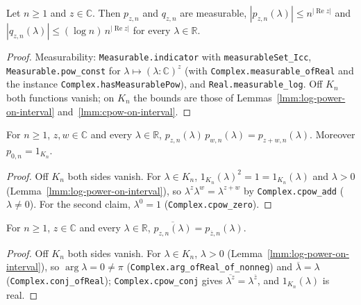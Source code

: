 \begin{lemma}
    \label{lmm:modular-power-function-bounds}
    \leanok
    Let $n \ge 1$ and $z \in \mathbb{C}$. Then $p_{z,n}$ and $q_{z,n}$ are measurable, $|p_{z,n}(\lambda)| \le n^{|\operatorname{Re} z|}$ and $|q_{z,n}(\lambda)| \le (\log n)\, n^{|\operatorname{Re} z|}$ for every $\lambda \in \mathbb{R}$.
\end{lemma}
\begin{proof}
    \leanok
    Measurability: \texttt{Measurable.indicator} with \texttt{measurableSet\_Icc}, \texttt{Measurable.pow\_const} for $\lambda \mapsto (\lambda : \mathbb{C})^z$ (with \texttt{Complex.measurable\_ofReal} and the instance \texttt{Complex.hasMeasurablePow}), and \texttt{Real.measurable\_log}. Off $K_n$ both functions vanish; on $K_n$ the bounds are those of Lemmas~\ref{lmm:log-power-on-interval} and~\ref{lmm:cpow-on-interval}.
\end{proof}

\begin{lemma}[Multiplicativity of $p_{z,n}$]
    \label{lmm:modular-power-function-identities}
    \leanok
    For $n \ge 1$, $z, w \in \mathbb{C}$ and every $\lambda \in \mathbb{R}$, $p_{z,n}(\lambda)\,p_{w,n}(\lambda) = p_{z+w,n}(\lambda)$. Moreover $p_{0,n} = 1_{K_n}$.
\end{lemma}
\begin{proof}
    \leanok
    Off $K_n$ both sides vanish. For $\lambda \in K_n$, $1_{K_n}(\lambda)^2 = 1 = 1_{K_n}(\lambda)$ and $\lambda > 0$ (Lemma~\ref{lmm:log-power-on-interval}), so $\lambda^z\lambda^w = \lambda^{z+w}$ by \texttt{Complex.cpow\_add} ($\lambda \ne 0$). For the second claim, $\lambda^0 = 1$ (\texttt{Complex.cpow\_zero}).
\end{proof}

\begin{lemma}[Conjugation of $p_{z,n}$]
    \label{lmm:modular-power-function-conj}
    \leanok
    For $n \ge 1$, $z \in \mathbb{C}$ and every $\lambda \in \mathbb{R}$, $\overline{p_{z,n}(\lambda)} = p_{\overline{z},n}(\lambda)$.
\end{lemma}
\begin{proof}
    \leanok
    Off $K_n$ both sides vanish. For $\lambda \in K_n$, $\lambda > 0$ (Lemma~\ref{lmm:log-power-on-interval}), so $\arg\lambda = 0 \ne \pi$ (\texttt{Complex.arg\_ofReal\_of\_nonneg}) and $\overline{\lambda} = \lambda$ (\texttt{Complex.conj\_ofReal}); \texttt{Complex.cpow\_conj} gives $\overline{\lambda^z} = \lambda^{\overline{z}}$, and $1_{K_n}(\lambda)$ is real.
\end{proof}

